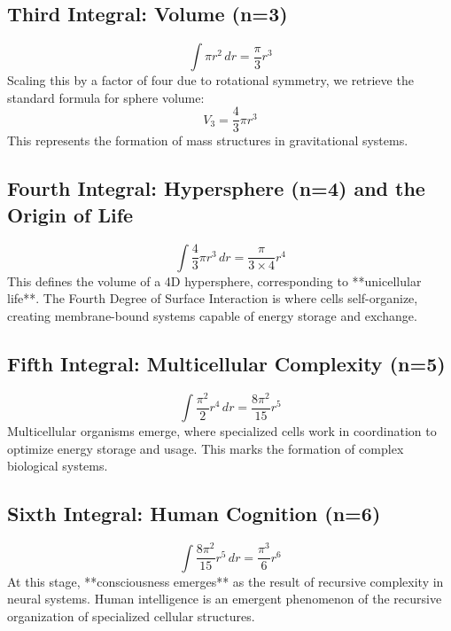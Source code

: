 \documentclass{article}
\begin{document}
\subsection{Third Integral: Volume (n=3)}
\begin{equation}
\int \pi r^2 \, dr = \frac{\pi}{3} r^3
\end{equation}
Scaling this by a factor of four due to rotational symmetry, we retrieve the standard formula for sphere volume:
\begin{equation}
V_3 = \frac{4}{3} \pi r^3
\end{equation}
This represents the formation of mass structures in gravitational systems.

\subsection{Fourth Integral: Hypersphere (n=4) and the Origin of Life}
\begin{equation}
\int \frac{4}{3} \pi r^3 \, dr = \frac{\pi}{3 \times 4} r^4
\end{equation}
This defines the volume of a 4D hypersphere, corresponding to **unicellular life**. The Fourth Degree of Surface Interaction is where cells self-organize, creating membrane-bound systems capable of energy storage and exchange.

\subsection{Fifth Integral: Multicellular Complexity (n=5)}
\begin{equation}
\int \frac{\pi^2}{2} r^4 \, dr = \frac{8\pi^2}{15} r^5
\end{equation}
Multicellular organisms emerge, where specialized cells work in coordination to optimize energy storage and usage. This marks the formation of complex biological systems.

\subsection{Sixth Integral: Human Cognition (n=6)}
\begin{equation}
\int \frac{8\pi^2}{15} r^5 \, dr = \frac{\pi^3}{6} r^6
\end{equation}
At this stage, **consciousness emerges** as the result of recursive complexity in neural systems. Human intelligence is an emergent phenomenon of the recursive organization of specialized cellular structures.
\end{document}
